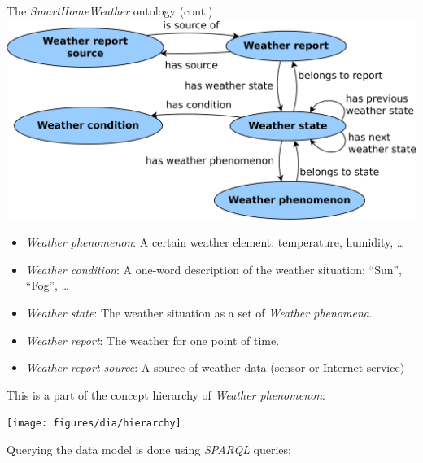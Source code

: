 \documentclass[final,hyperref={pdfpagelabels=true}]{beamer}
\begin{document}
\begin{frame}[fragile]
\begin{columns}[t]
    \begin{column}{.45\textwidth}
      \begin{block}{The \emph{SmartHomeWeather} ontology (cont.)}
	\includegraphics[width=\textwidth]{figures/dia/binary-relations}
	\begin{itemize}
	  \item \emph{Weather phenomenon}: A certain weather
		  element: temperature, humidity, …
	  \item \emph{Weather condition}: A one-word description of the
		  weather situation: ``Sun'', ``Fog'', …
	  \item \emph{Weather state}: The weather situation as a
		  set of \emph{Weather phenomena}.
          \item \emph{Weather report}: The weather for one
		  point of time.
	  \item \emph{Weather report source}: A source of weather data
		  (sensor or Internet service)
	\end{itemize}

	\vspace{.5em}
	
	This is a part of the concept hierarchy of \emph{Weather phenomenon}:
	
	\vspace{1em}
	\texttt{[image: figures/dia/hierarchy]}

	\vspace{.5em}
	Querying the data model is done using \emph{SPARQL} queries:


\end{block}
\end{column}
\end{columns}
\end{frame}
\end{document}
